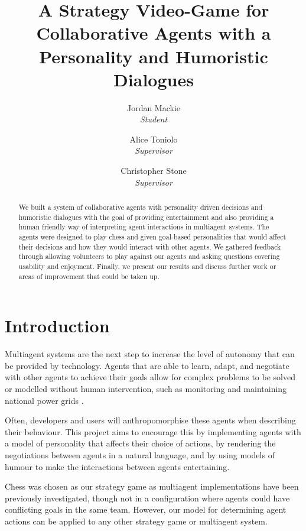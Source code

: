 \documentclass{article}
\begin{document}
\title{A Strategy Video-Game for Collaborative Agents with a Personality and Humoristic Dialogues\\
}

\author{
Jordan Mackie \\
\textit{Student}
\and
Alice Toniolo \\
\textit{Supervisor}
\and
Christopher Stone \\
\textit{Supervisor}
}

\maketitle

\begin{abstract}

	We built a system of collaborative agents with personality driven decisions and humoristic dialogues with the goal of providing entertainment and also providing a human friendly way of interpreting agent interactions in multiagent systems. The agents were designed to play chess and given goal-based personalities that would affect their decisions and how they would interact with other agents. We gathered feedback through allowing volunteers to play against our agents and asking questions covering usability and enjoyment. Finally, we present our results and discuss further work or areas of improvement that could be taken up.

\end{abstract}

\section{Introduction}

Multiagent systems are the next step to increase the level of autonomy that can be provided by technology. Agents that are able to learn, adapt, and negotiate with other agents to achieve their goals allow for complex problems to be solved or modelled without human intervention, such as monitoring and maintaining national power grids \cite{archon}. 

Often, developers and users will anthropomorphise these agents when describing their behaviour. This project aims to encourage this by implementing agents with a model of personality that affects their choice of actions, by rendering the negotiations between agents in a natural language, and by using models of humour to make the interactions between agents entertaining. 

Chess was chosen as our strategy game as multiagent implementations have been previously investigated, though not in a configuration where agents could have conflicting goals in the same team. However, our model for determining agent actions can be applied to any other strategy game or multiagent system.
\end{document}
